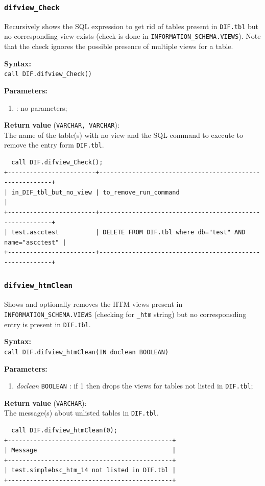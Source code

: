 \documentclass[10pt,titlepage]{article}
\newcommand{\syntax}[1]
{
  \bigskip
  \noindent
  \textbf{Syntax:} \\ 
  \indent \texttt{#1}
}
\newenvironment{parameters}
{
  \medskip
  \noindent
  \textbf{Parameters:}
  \begin{enumerate}
}
{
  \end{enumerate}
}
\newcommand{\param}[2]
{
  \item \textit{#1} \texttt{#2} 
}
\newcommand{\return}[1]
{
  \medskip
  \noindent
  \textbf{Return value} (\texttt{#1}): \\
  \indent
}
\newcommand{\example}
{
\medskip
\noindent{\textbf{Example:}}
}
\begin{document}
\subsubsection{{\tt difview\_Check}}
Recursively shows the SQL expression to get rid of tables present in {\tt DIF.tbl} but no
corresponding view exists (check is done in {\tt INFORMATION\_SCHEMA.VIEWS}).
Note that the check ignores the possible presence of multiple views for a
table.

\syntax{call DIF.difview\_Check()}

\begin{parameters}
  \param{}{}: no parameters;
\end{parameters}

\return{VARCHAR, VARCHAR} The name of the table(s) with no view and the SQL
command to execute to remove the entry form {\tt DIF.tbl}.

\example
%
\begin{verbatim}
  call DIF.difview_Check();
+------------------------+---------------------------------------------------------+
| in_DIF_tbl_but_no_view | to_remove_run_command                                   |
+------------------------+---------------------------------------------------------+
| test.ascctest          | DELETE FROM DIF.tbl where db="test" AND name="ascctest" |
+------------------------+---------------------------------------------------------+
\end{verbatim}
%
%



\subsubsection{{\tt difview\_htmClean}}
Shows and optionally removes the HTM views present in {\tt INFORMATION\_SCHEMA.VIEWS}
(checking for {\tt \_htm} string) but no corresponsding entry is present in {\tt DIF.tbl}.

\syntax{call DIF.difview\_htmClean(IN doclean BOOLEAN)}

\begin{parameters}
  \param{doclean}{BOOLEAN}: if 1 then drops the views for tables not listed in {\tt DIF.tbl};
\end{parameters}

\return{VARCHAR} The message(s) about unlisted tables in {\tt DIF.tbl}.

\example
%
\begin{verbatim}
  call DIF.difview_htmClean(0);
+---------------------------------------------+
| Message                                     |
+---------------------------------------------+
| test.simplebsc_htm_14 not listed in DIF.tbl |
+---------------------------------------------+
\end{verbatim}
%
%
\end{document}
